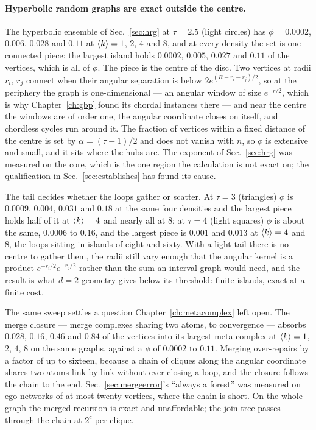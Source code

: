 \paragraph{Hyperbolic random graphs are exact outside the centre.} The
hyperbolic ensemble of Sec.~\ref{sec:hrg} at $\tau=2.5$ (light circles) has
$\phi=0.0002$, $0.006$, $0.028$ and $0.11$ at $\langle k \rangle=1$, $2$, $4$ and $8$,
and at every density the set is one connected piece: the largest island
holds $0.0002$, $0.005$, $0.027$ and $0.11$ of the vertices, which is all of
$\phi$. The piece is the centre of the disc. Two vertices at radii $r_{i}$,
$r_{j}$ connect when their angular separation is below
$2e^{(R-r_{i}-r_{j})/2}$, so at the periphery the graph is one-dimensional
--- an angular window of size $e^{-r/2}$, which is why Chapter~\ref{ch:gbp}
found its chordal instances there --- and near the centre the windows are of
order one, the angular coordinate closes on itself, and chordless cycles run
around it. The fraction of vertices within a fixed distance of the centre is
set by $\alpha=(\tau-1)/2$ and does not vanish with $n$, so $\phi$ is
extensive and small, and it sits where the hubs are. The exponent of
Sec.~\ref{sec:hrg} was measured on the core, which is the one region the
calculation is not exact on; the qualification in
Sec.~\ref{sec:establishes} has found its cause.

The tail decides whether the loops gather or scatter. At $\tau=3$
(triangles) $\phi$ is $0.0009$, $0.004$, $0.031$ and $0.18$ at the same
four densities and the largest piece holds half of it at $\langle k \rangle=4$ and
nearly all at $8$; at $\tau=4$ (light squares) $\phi$ is about the same,
$0.0006$ to $0.16$, and the largest piece is $0.001$ and $0.013$ at
$\langle k \rangle=4$ and $8$, the loops sitting in islands of eight and sixty. With a
light tail there is no centre to gather them, the radii still vary enough
that the angular kernel is a product $e^{-r_{i}/2}e^{-r_{j}/2}$ rather than
the sum an interval graph would need, and the result is what $d=2$ geometry
gives below its threshold: finite islands, exact at a finite cost.

The same sweep settles a question Chapter~\ref{ch:metacomplex} left open. The
merge closure --- merge complexes sharing two atoms, to convergence ---
absorbs $0.028$, $0.16$, $0.46$ and $0.84$ of the vertices into its largest
meta-complex at $\langle k \rangle=1$, $2$, $4$, $8$ on the same graphs, against a
$\phi$ of $0.0002$ to $0.11$. Merging over-repairs by a factor of up to
sixteen, because a chain of cliques along the angular coordinate shares two
atoms link by link without ever closing a loop, and the closure follows the
chain to the end. Sec.~\ref{sec:mergeerror}'s ``always a forest'' was
measured on ego-networks of at most twenty vertices, where the chain is
short. On the whole graph the merged recursion is exact and unaffordable;
the join tree passes through the chain at $2^{c}$ per clique.

